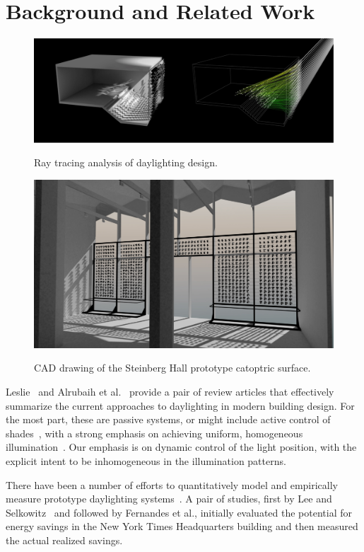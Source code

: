 \section{Background and Related Work}
\label{sec:background}


\begin{figure}[ht]
\centering
\includegraphics[width=0.8\linewidth]{figures/raytracing}
\label{fig:raytracing}
\caption{Ray tracing analysis of daylighting design.}
\end{figure}

\begin{figure}[ht]
\centering
\includegraphics[width=0.8\linewidth]{figures/steinberg2}
\label{fig:steinberg2}
\caption{CAD drawing of the Steinberg Hall prototype catoptric surface.}
\end{figure}

Leslie~\cite{Leslie03} and Alrubaih et al.~\cite{azaise13} provide
a pair of review articles that effectively summarize the current
approaches to daylighting in modern building design.
For the most part, these are passive systems, or might include
active control of shades~\cite{kt16}, with a strong emphasis on
achieving uniform, homogeneous illumination~\cite{bwkk15,gb16}.
Our emphasis is on dynamic control of the light position, with the explicit
intent to be inhomogeneous in the illumination patterns.

There have been a number of efforts to quantitatively model and
empirically measure prototype daylighting
systems~\cite{bwkk15,fsdm14,ls06,vgf+13}. A pair of studies, first by
Lee and Selkowitz~\cite{ls06} and followed by Fernandes et al.\cite{fsdm14},
initially evaluated the potential for energy savings in the New York Times
Headquarters building and then measured the actual realized savings.

